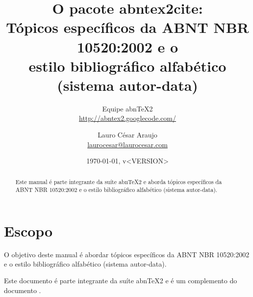 \documentclass[a4paper]{ltxdoc}
\begin{document}
\nocite{santos1994}
\nocite{secretaria1999} %
\nocite{redes1995}
\nocite{makau1962} %

\newcommand{\titulo}{\textbf{O pacote \textsf{abntex2cite}}:\\ \Large{Tópicos
específicos da ABNT NBR 10520:2002 e o \\ estilo bibliográfico alfabético
(sistema autor-data)}}

\newcommand{\abnTeX}{abn\TeX}
\newcommand{\abnTeXSite}{\url{http://abntex2.googlecode.com/}}
\newcommand{\optiondefaultval}[1]{\underline{\texttt{#1}}}

\title{\titulo}
\author{Equipe \abnTeX2\\\abnTeXSite 
\and 
Lauro César Araujo\\\url{laurocesar@laurocesar.com}}
\date{\today, v<VERSION>}

\maketitle


\begin{abstract}
Este manual é parte integrante da suíte \abnTeX2 e aborda tópicos específicos
da ABNT NBR 10520:2002 e o estilo bibliográfico alfabético (sistema
autor-data).
\end{abstract}


\tableofcontents

\listoftables

\section{Escopo}

O objetivo deste manual é abordar tópicos específicos da ABNT NBR 10520:2002 e
o estilo bibliográfico alfabético (sistema autor-data). 

Este documento é parte integrante da suíte \abnTeX2 e é um complemento do
documento .
\end{document}
